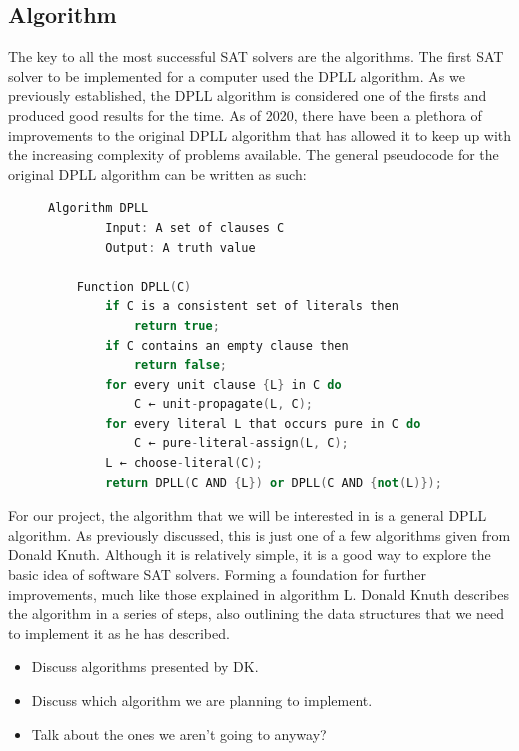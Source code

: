 \documentclass{article}
\begin{document}
\subsection{Algorithm}
The key to all the most successful SAT solvers are the algorithms. The first SAT solver to be implemented for a computer used the DPLL algorithm. As we previously established, the DPLL algorithm is considered one of the firsts and produced good results for the time. As of 2020, there have been a plethora of improvements to the original DPLL algorithm that has allowed it to keep up with the increasing complexity of problems available. The general pseudocode for the original DPLL algorithm can be written as such:

\begin{figure}[h]
\begin{lstlisting}[language=C++]
    Algorithm DPLL
        Input: A set of clauses C
        Output: A truth value

    Function DPLL(C)
        if C is a consistent set of literals then
            return true;
        if C contains an empty clause then
            return false;
        for every unit clause {L} in C do
            C ← unit-propagate(L, C);
        for every literal L that occurs pure in C do
            C ← pure-literal-assign(L, C);
        L ← choose-literal(C);
        return DPLL(C AND {L}) or DPLL(C AND {not(L)});
\end{lstlisting}
\end{figure}

For our project, the algorithm that we will be interested in is a general DPLL algorithm. As previously discussed, this is just one of a few algorithms given from Donald Knuth. Although it is relatively simple, it is a good way to explore the basic idea of software SAT solvers. Forming a foundation for further improvements, much like those explained in algorithm L. Donald Knuth describes the algorithm in a series of steps, also outlining the data structures that we need to implement it as he has described.


\begin{itemize}
    \item Discuss algorithms presented by DK.
    \item Discuss which algorithm we are planning to implement.
    \item Talk about the ones we aren't going to anyway?
\end{itemize}
\end{document}
